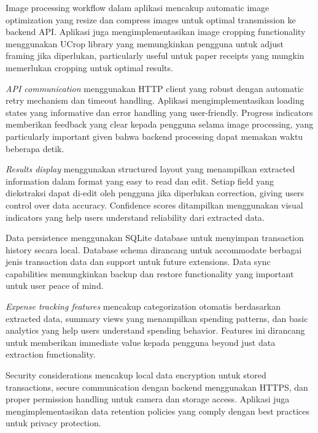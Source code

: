 Image processing workflow dalam aplikasi mencakup automatic image optimization yang resize dan compress images untuk optimal transmission ke backend API. Aplikasi juga mengimplementasikan image cropping functionality menggunakan UCrop library yang memungkinkan pengguna untuk adjust framing jika diperlukan, particularly useful untuk paper receipts yang mungkin memerlukan cropping untuk optimal results.


\emph{API communication} menggunakan HTTP client yang robust dengan automatic retry mechanism dan timeout handling. Aplikasi mengimplementasikan loading states yang informative dan error handling yang user-friendly. Progress indicators memberikan feedback yang clear kepada pengguna selama image processing, yang particularly important given bahwa backend processing dapat memakan waktu beberapa detik.

\emph{Results display} menggunakan structured layout yang menampilkan extracted information dalam format yang easy to read dan edit. Setiap field yang diekstraksi dapat di-edit oleh pengguna jika diperlukan correction, giving users control over data accuracy. Confidence scores ditampilkan menggunakan visual indicators yang help users understand reliability dari extracted data.

Data persistence menggunakan SQLite database untuk menyimpan transaction history secara local. Database schema dirancang untuk accommodate berbagai jenis transaction data dan support untuk future extensions. Data sync capabilities memungkinkan backup dan restore functionality yang important untuk user peace of mind.

\emph{Expense tracking features} mencakup categorization otomatis berdasarkan extracted data, summary views yang menampilkan spending patterns, dan basic analytics yang help users understand spending behavior. Features ini dirancang untuk memberikan immediate value kepada pengguna beyond just data extraction functionality.

Security considerations mencakup local data encryption untuk stored transactions, secure communication dengan backend menggunakan HTTPS, dan proper permission handling untuk camera dan storage access. Aplikasi juga mengimplementasikan data retention policies yang comply dengan best practices untuk privacy protection.

